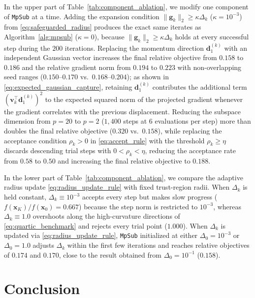 \documentclass[smallextended]{svjour3}
\newcommand{\bx}{\bm{x}}
\newcommand{\bd}{\bm{d}}
\newcommand{\bg}{\bm{g}}
\begin{document}
In the upper part of Table~\ref{tab:component_ablation}, we modify one component of \texttt{MpSub} at a time. Adding the expansion condition $\|\bg_k\|_2 \ge \kappa\Delta_k$ ($\kappa = 10^{-3}$) from \eqref{eq:safeguarded_radius} produces the exact same iterates as Algorithm~\ref{alg:mpsub} ($\kappa = 0$), because $\|\bg_k\|_2 \ge \kappa\Delta_k$ holds at every successful step during the $200$ iterations. Replacing the momentum direction $\bd_1^{(k)}$ with an independent Gaussian vector increases the final relative objective from $0.158$ to $0.186$ and the relative gradient norm from $0.194$ to $0.223$ with non-overlapping seed ranges ($0.150$--$0.170$ vs.\ $0.168$--$0.204$); as shown in \eqref{eq:expected_gaussian_capture}, retaining $\bd_1^{(k)}$ contributes the additional term $(\bm v_k^\top\bd_1^{(k)})^2$ to the expected squared norm of the projected gradient whenever the gradient correlates with the previous displacement. Reducing the subspace dimension from $p=20$ to $p=2$ ($1{,}400$ steps at $6$ evaluations per step) more than doubles the final relative objective ($0.320$ vs.\ $0.158$), while replacing the acceptance condition $\rho_k > 0$ in \eqref{eq:accept_rule} with the threshold $\rho_k \ge \eta$ discards descending trial steps with $0 < \rho_k < \eta$, reducing the acceptance rate from $0.58$ to $0.50$ and increasing the final relative objective to $0.188$.

In the lower part of Table~\ref{tab:component_ablation}, we compare the adaptive radius update \eqref{eq:radius_update_rule} with fixed trust-region radii. When $\Delta_k$ is held constant, $\Delta_k \equiv 10^{-3}$ accepts every step but makes slow progress ($f(\bx_K)/f(\bx_0) = 0.667$) because the step norm is restricted to $10^{-3}$, whereas $\Delta_k \equiv 1.0$ overshoots along the high-curvature directions of \eqref{eq:quartic_benchmark} and rejects every trial point ($1.000$). When $\Delta_k$ is updated via \eqref{eq:radius_update_rule}, \texttt{MpSub} initialized at either $\Delta_0 = 10^{-3}$ or $\Delta_0 = 1.0$ adjusts $\Delta_k$ within the first few iterations and reaches relative objectives of $0.174$ and $0.170$, close to the result obtained from $\Delta_0 = 10^{-1}$ ($0.158$).

\section{Conclusion}
\label{sec:conclusion}
\end{document}
